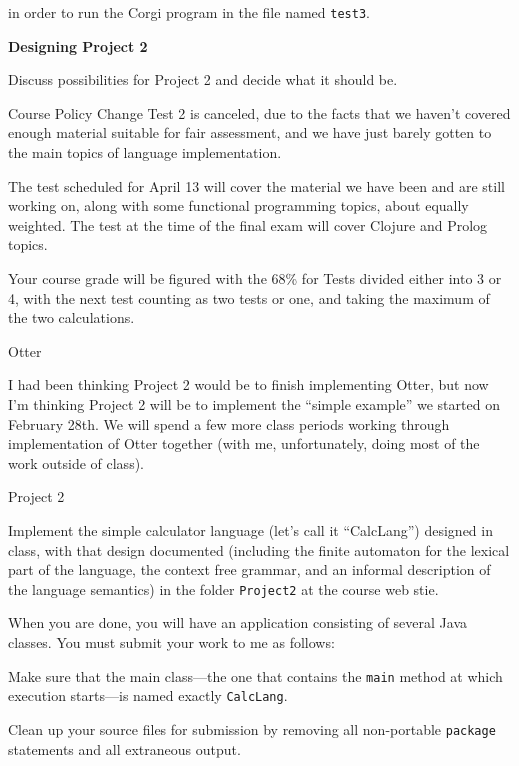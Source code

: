 in order to run the Corgi program in the file named {\tt test3}.
\border

\vfil\eject

\bye

{\bf Designing Project 2}
\medskip

\doit Discuss possibilities for Project 2 and decide what it should be.
\vfil\eject

{\bigboldfont Course Policy Change}
\medskip
Test 2 is canceled, due to the facts that we haven't covered enough material suitable for fair assessment, 
and we have just barely gotten to the main topics of language implementation.
\medskip

The test scheduled for April 13 will cover the material we have been and are still working on, along
with some functional programming topics, about equally weighted.  The test at the time of the final exam
will cover Clojure and Prolog topics.
\medskip

Your course grade will be figured with the 68\% for Tests divided either into 3 or 4, with the next test counting
as two tests or one, and taking the maximum of the two calculations.
\border

{\bigboldfont Otter}
\medskip

I had been thinking Project 2 would be to finish implementing Otter, but now I'm thinking Project 2 will be
to implement the ``simple example'' we started on February 28th.  We will spend a few more class periods
working through implementation of Otter together (with me, unfortunately, doing most of the work outside of
class).
\border

{\bigboldfont Project 2}
\medskip

Implement the simple calculator language (let's call it ``CalcLang'') designed in class, with that design
documented (including the finite automaton for the lexical part of the language, the context free grammar,
and an informal description of the language semantics) in the folder {\tt Project2} at the course web stie.
\medskip

When you are done, you will have an application consisting of several Java classes.  You must submit your
work to me as follows:
\medskip

\In
  Make sure that the main class---the one that contains the {\tt main} method at which execution starts---is
  named exactly {\tt CalcLang}.
  \medskip
  
  Clean up your source files for submission by removing all non-portable {\tt package} statements and
  all extraneous output.
  \medskip
  
